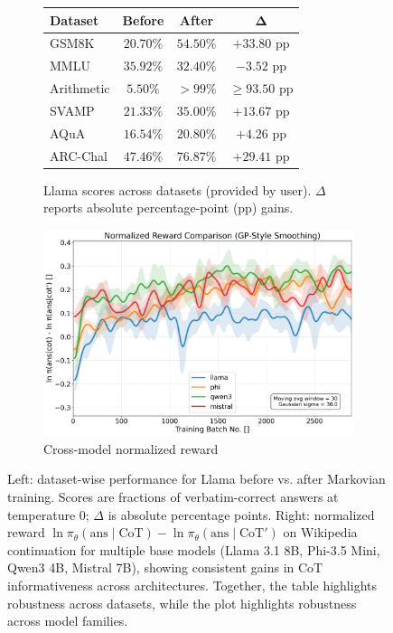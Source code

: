 \documentclass{article} %
\begin{document}
\begin{figure}[t]
  \centering
    \begin{subfigure}[b]{0.44\textwidth}
        \centering
        \small
        \begin{tabular}{lccc}
            \toprule
            \textbf{Dataset} & \textbf{Before} & \textbf{After} & $\boldsymbol{\Delta}$ \\
            \midrule
            GSM8K & $20.70\%$ & $54.50\%$ & $+33.80$ pp \\
            MMLU & $35.92\%$ & $32.40\%$ & $-3.52$ pp \\
            Arithmetic & $5.50\%$ & $>99\%$ & $\ge 93.50$ pp \\
            SVAMP & $21.33\%$ & $35.00\%$ & $+13.67$ pp \\
            AQuA & $16.54\%$ & $20.80\%$ & $+4.26$ pp \\
            ARC-Chal & $47.46\%$ & $76.87\%$ & $+29.41$ pp \\
            \bottomrule
        \end{tabular}
        \caption{Llama scores across datasets (provided by user). $\Delta$ reports absolute percentage-point (pp) gains.}
    \end{subfigure}
    \hfill
    \begin{subfigure}[b]{0.52\textwidth}
        \centering
        \includegraphics[width=\textwidth]{Figures/combined_normalized_reward_gp_smoothed.png}
        \caption{Cross-model normalized reward}
    \end{subfigure}
    \caption{Left: dataset-wise performance for Llama before vs. after Markovian training. Scores are fractions of verbatim-correct answers at temperature 0; $\Delta$ is absolute percentage points. Right: normalized reward $\ln \pi_\theta(\text{ans} \mid \text{CoT}) - \ln \pi_\theta(\text{ans} \mid \text{CoT}')$ on Wikipedia continuation for multiple base models (Llama 3.1 8B, Phi-3.5 Mini, Qwen3 4B, Mistral 7B), showing consistent gains in CoT informativeness across architectures. Together, the table highlights robustness across datasets, while the plot highlights robustness across model families.}
    \label{fig:loss}
\end{figure}
\end{document}
